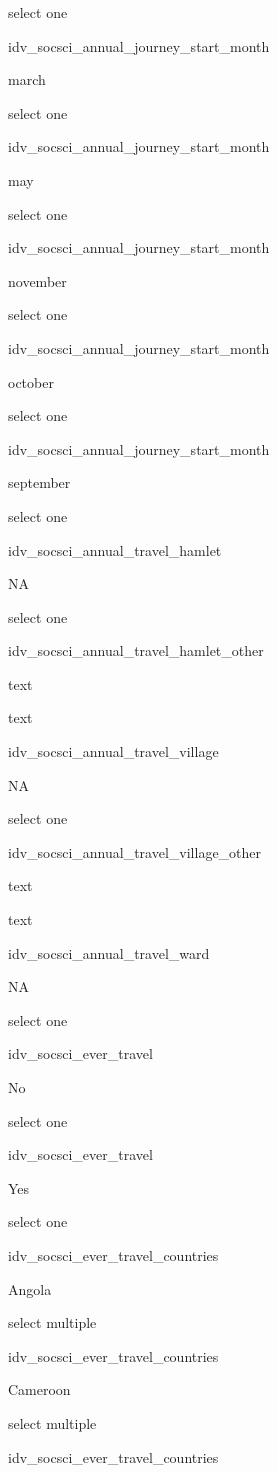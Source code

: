 \documentclass[]{article}
\begin{document}
select one

idv\_socsci\_annual\_journey\_start\_month

march

select one

idv\_socsci\_annual\_journey\_start\_month

may

select one

idv\_socsci\_annual\_journey\_start\_month

november

select one

idv\_socsci\_annual\_journey\_start\_month

october

select one

idv\_socsci\_annual\_journey\_start\_month

september

select one

idv\_socsci\_annual\_travel\_hamlet

NA

select one

idv\_socsci\_annual\_travel\_hamlet\_other

text

text

idv\_socsci\_annual\_travel\_village

NA

select one

idv\_socsci\_annual\_travel\_village\_other

text

text

idv\_socsci\_annual\_travel\_ward

NA

select one

idv\_socsci\_ever\_travel

No

select one

idv\_socsci\_ever\_travel

Yes

select one

idv\_socsci\_ever\_travel\_countries

Angola

select multiple

idv\_socsci\_ever\_travel\_countries

Cameroon

select multiple

idv\_socsci\_ever\_travel\_countries
\end{document}
